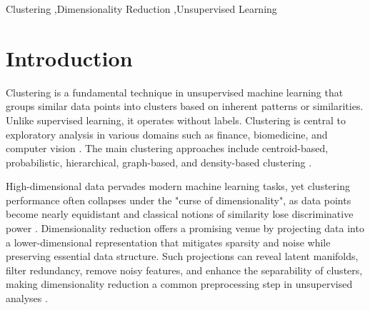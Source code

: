 \documentclass[preprint,12pt]{elsarticle}
\begin{document}
\begin{@twocolumnfalse}
\begin{frontmatter}
\begin{abstract}
\end{abstract}



\begin{keyword}
Clustering \sep Dimensionality Reduction \sep Unsupervised Learning


\end{keyword}

\end{frontmatter}
\end{@twocolumnfalse}

\section{Introduction}\label{sec:intro}

Clustering is a fundamental technique in unsupervised machine learning that groups similar data points into clusters based on inherent patterns or similarities. Unlike supervised learning, it operates without labels. Clustering is central to exploratory analysis in various domains such as finance, biomedicine, and computer vision \cite{ezugwu2022comprehensiv,oyewole2023data,tahiri2018new,zhou2024survey}. The main clustering approaches include centroid-based, probabilistic, hierarchical, graph-based, and density-based clustering \cite{wani2024comprehensive}.

High-dimensional data pervades modern machine learning tasks, yet clustering performance often collapses under the "curse of dimensionality", as data points become nearly equidistant and classical notions of similarity lose discriminative power \cite{thrun2021distance}. Dimensionality reduction offers a promising venue by projecting data into a lower-dimensional representation that mitigates sparsity and noise while preserving essential data structure. Such projections can reveal latent manifolds, filter redundancy, remove noisy features, and enhance the separability of clusters, making dimensionality reduction a common preprocessing step in unsupervised analyses \cite{jia2022feature}.
\end{document}
